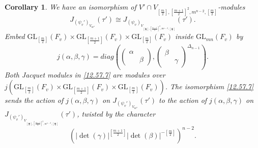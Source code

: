 \documentclass[12pts]{amsart}
\newcommand{\GL}{{\mathrm{GL}}}
\newtheorem{cor}[thm]{Corollary}
\begin{document}
\begin{cor}\label{cor 12.7}
We have an isomorphism of $V'\cap V_{[\frac{m}{2}],[\frac{m+1}{2}]^2,m^{n-2},[\frac{m}{2}]}$-modules
\begin{equation}\label{12.57.7}
J_{(\psi_v')_{V_{m^n}}}(\tau')\cong J_{(\psi_v)_{V_{[\frac{m}{2}],[\frac{m+1}{2}]^2,m^{n-2},[\frac{m}{2}]}}}(\tau').
\end{equation}
Embed $\GL_{[\frac{m}{2}]}(F_v)\times \GL_{[\frac{m+1}{2}]}(F_v)\times \GL_{[\frac{m}{2}]}(F_v)$ inside $\GL_{mn}(F_v)$ by
\begin{equation}\label{12.59}
j(\alpha,\beta,\gamma)=diag(\begin{pmatrix}\alpha\\&\beta\end{pmatrix},\begin{pmatrix}\beta\\&\gamma\end{pmatrix}^{\Delta_{n-1}}). 
\end{equation}
Both Jacquet modules in \eqref{12.57.7} are modules over $j(\GL_{[\frac{m}{2}]}(F_v)\times \GL_{[\frac{m+1}{2}]}(F_v)\times \GL_{[\frac{m}{2}]}(F_v))$. The isomorphism \eqref{12.57.7} sends the action of $j(\alpha, \beta, \gamma)$ on $J_{(\psi_v')_{V_{m^n}}}(\tau')$ to the action of $j(\alpha, \beta, \gamma)$ on $J_{(\psi_v')_{V_{[\frac{m}{2}],[\frac{m+1}{2}]^2,m^{n-2},[\frac{m}{2}]}}}(\tau')$, twisted by the character
\begin{equation}\label{12.57.8} (|\det(\gamma)|^{[\frac{m+1}{2}]}|\det(\beta)|^{-[\frac{m}{2}]})^{n-2}.
\end{equation}
\end{cor}
\end{document}

